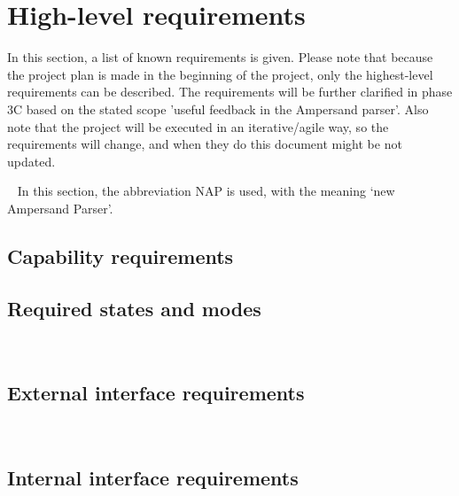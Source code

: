 \section{High-level requirements}
\label{sec:requirements}
In this section, a list of known requirements is given.
Please note that because the project plan is made in the beginning of the project, only the highest-level requirements can be described.
The requirements will be further clarified in phase 3C based on the stated scope 'useful feedback in the Ampersand parser'.
Also note that the project will be executed in an iterative/agile way, so the requirements will change, and when they do this document might be not updated.

~\newline\noindent
In this section, the abbreviation NAP is used, with the meaning `new Ampersand Parser'.
%

\subsection{Capability requirements}

\subsection{Required states and modes}
\\


\subsection{External interface requirements}
\\


\subsection{Internal interface requirements}

